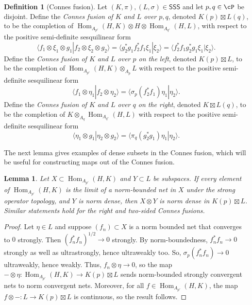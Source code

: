 \documentclass[11pt,reqno]{amsart}
\DeclareMathOperator{\Hom}{Hom}
\newcommand{\SSS}{\mathsf{SSS}}
\numberwithin{equation}{section}
\theoremstyle{plain}
\newtheorem{lemma}[equation]{Lemma}
\theoremstyle{definition}
\newtheorem{definition}[equation]{Definition}
\begin{document}
\begin{definition}[Connes fusion]\label{def:Connes-fusion}
    Let $(K,\pi),(L,\sigma)\in \SSS$ and let $p,q\in{\cP}$ be disjoint. Define the \emph{Connes fusion of $K$ and $L$ over $p,q$}, denoted $K(p)\boxtimes L(q)$, to be the completion of $\Hom_{A_{p'}}(H,K)\otimes H\otimes \Hom_{A_{q'}}(H,L)$, with respect to the positive semi-definite sesquilinear form
    \[
    \langle f_1\otimes\xi_1\otimes g_1|f_2\otimes\xi_2\otimes g_2\rangle=\langle g_2^*g_1f_2^*f_1\xi_1|\xi_2\rangle=\langle f_2^*f_1g_2^*g_1\xi_1|\xi_2\rangle.
    \]
    Define the \emph{Connes fusion of $K$ and $L$ over $p$ on the left}, denoted $K(p)\boxtimes L$, to be the completion of $\Hom_{A_{p'}}(H,K)\otimes_{A_p} L$ with respect to the positive semi-definite sesquilinear form
    \[
    \langle f_1\otimes\eta_1|f_2\otimes\eta_2\rangle=\langle \sigma_p(f_2^*f_1)\eta_1|\eta_2\rangle.
    \]
    Define the \emph{Connes fusion of $K$ and $L$ over $q$ on the right}, denoted $K\boxtimes L(q)$, to be the completion of $K\otimes_{A_q}\Hom_{A_{q'}}(H,L)$ with respect to the positive semi-definite sesquilinear form
    \[
    \langle \eta_1\otimes g_1|\eta_2\otimes g_2\rangle=\langle \pi_q(g_2^*g_1)\eta_1|\eta_2\rangle.
    \]
\end{definition}

The next lemma gives examples of dense subsets in the Connes fusion, which will be useful for constructing maps out of the Connes fusion.
\begin{lemma}\label{lemma:dense-subsets-of-Connes-fusion} Let $X\subset \Hom_{A_{p'}}(H,K)$ and $Y\subset L$ be subspaces. If every element of $\Hom_{A_{p'}}(H,K)$ is the limit of a norm-bounded net in $X$ under the strong operator topology, and $Y$ is norm dense, then $X\otimes Y$ is norm dense in $K(p)\boxtimes L$. Similar statements hold for the right and two-sided Connes fusions.
\end{lemma}

\begin{proof}
    Let $\eta\in L$ and suppose $(f_n)\subset X$ is a norm bounded net that converges to $0$ strongly. Then $(f_n^*f_n)^{1/2}\to 0$ strongly. By norm-boundedness, $f_n^*f_n\to 0$ strongly as well as ultrastrongly, hence ultraweakly too. So, $\sigma_p(f_n^*f_n)\to0$ ultraweakly, hence weakly. Thus, $f_n\otimes\eta\to0$, so the map $-\otimes\eta:\Hom_{A_{p'}}(H,K)\to K(p)\boxtimes L$ sends norm-bounded strongly convergent nets to norm convergent nets. Moreover, for all $f\in \Hom_{A_{p'}}(H,K)$, the map $f\otimes-:L\to K(p)\boxtimes L$ is continuous, so the result follows.
\end{proof}
\end{document}
